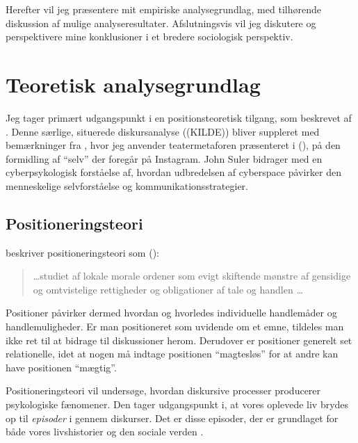 Herefter vil jeg præsentere mit empiriske analysegrundlag, med
tilhørende diskussion af mulige analyseresultater. Afslutningsvis
vil jeg diskutere og perspektivere mine konklusioner i et bredere
sociologisk perspektiv.

\section{Teoretisk analysegrundlag}

Jeg tager primært udgangspunkt i en positionsteoretisk tilgang, 
som beskrevet af \citeauthor{harrePositioningTheoryMoral1999}.   
Denne særlige, situerede diskursanalyse ((KILDE)) bliver suppleret
med bemærkninger fra 
\citeauthor{goffmanPresentationSelfEveryday1956}, hvor jeg 
anvender teatermetaforen præsenteret i 
(\citeyear{goffmanPresentationSelfEveryday1956}), på den 
formidling af “selv” der foregår på Instagram.  John Suler
bidrager med en cyberpsykologisk forståelse af, hvordan 
udbredelsen af cyberspace påvirker den menneskelige selvforståelse
og kommunikationsstrategier.

\subsection{Positioneringsteori}

\citeauthor{harrePositioningTheoryMoral1999} beskriver 
positioneringsteori som (\citeyear[s. 1, min oversættelse
]{harrePositioningTheoryMoral1999}):
\begin{quotation}
  \ldots studiet af lokale morale ordener som evigt skiftende 
  mønstre af gensidige og omtvistelige rettigheder og 
  obligationer af tale og handlen \ldots
\end{quotation}

Positioner påvirker dermed hvordan og hvorledes individuelle 
handlemåder og handlemuligheder. Er man positioneret som uvidende 
om et emne, tildeles man ikke ret til at bidrage til diskussioner 
herom. Derudover er positioner generelt set relationelle, idet at 
nogen må indtage positionen “magtesløs” for at andre kan have 
positionen “mægtig”.

Positioneringsteori vil undersøge, hvordan diskursive processer 
producerer psykologiske fænomener. Den tager udgangspunkt i, at 
vores oplevede liv brydes op til \emph{episoder} i gennem 
diskurser. Det er disse episoder, der er grundlaget for både vores
livshistorier og den sociale verden \autocite[s. 
4]{harrePositioningTheoryMoral1999}.

